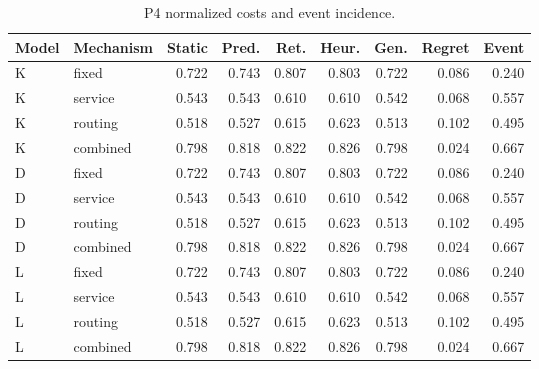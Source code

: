 \begin{table}[htbp]\caption{P4 normalized costs and event incidence.}\centering\small\setlength{\tabcolsep}{3pt}

\begin{tabular}{llrrrrrrr}\toprule

Model & Mechanism & Static & Pred. & Ret. & Heur. & Gen. & Regret & Event\\\midrule

K & fixed & 0.722 & 0.743 & 0.807 & 0.803 & 0.722 & 0.086 & 0.240\\

K & service & 0.543 & 0.543 & 0.610 & 0.610 & 0.542 & 0.068 & 0.557\\

K & routing & 0.518 & 0.527 & 0.615 & 0.623 & 0.513 & 0.102 & 0.495\\

K & combined & 0.798 & 0.818 & 0.822 & 0.826 & 0.798 & 0.024 & 0.667\\

D & fixed & 0.722 & 0.743 & 0.807 & 0.803 & 0.722 & 0.086 & 0.240\\

D & service & 0.543 & 0.543 & 0.610 & 0.610 & 0.542 & 0.068 & 0.557\\

D & routing & 0.518 & 0.527 & 0.615 & 0.623 & 0.513 & 0.102 & 0.495\\

D & combined & 0.798 & 0.818 & 0.822 & 0.826 & 0.798 & 0.024 & 0.667\\

L & fixed & 0.722 & 0.743 & 0.807 & 0.803 & 0.722 & 0.086 & 0.240\\

L & service & 0.543 & 0.543 & 0.610 & 0.610 & 0.542 & 0.068 & 0.557\\

L & routing & 0.518 & 0.527 & 0.615 & 0.623 & 0.513 & 0.102 & 0.495\\

L & combined & 0.798 & 0.818 & 0.822 & 0.826 & 0.798 & 0.024 & 0.667\\

\bottomrule\end{tabular}\end{table}

